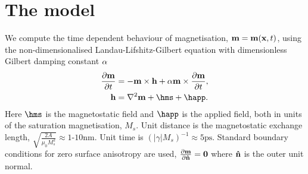 \documentclass[10pt, final, conference, transmag]{IEEEtran}
\begin{document}
\section{The model}

\iftransmagpaper
We compute the time dependent behaviour of magnetisation, $\mathbf{m} = \mathbf{m}(\mathbf{x}, t)$, using the non-dimensionalised
Landau-Lifshitz-Gilbert equation \cite{Aharoni1996} with dimensionless Gilbert damping constant $\alpha$
\begin{equation}
  \begin{aligned}
    \dmdt &= - \mv \times \hv + \dampc \mv \times \dmdt, \\
    \hv &= \lap \mv + \hms + \happ. \label{llg}
  \end{aligned}
\end{equation}
Here $\hms$ is the magnetostatic field and $\happ$ is the applied field, both in units of the saturation magnetisation, $M_s$.
Unit distance is the magnetostatic exchange length,
$\sqrt{\frac{2A}{\mu_0 M_s^2}} \approx 1\text{-}10\text{nm}$.
Unit time is $(|\gamma| M_s)^{-1} \approx 5\text{ps}$.
Standard boundary conditions for zero surface anisotropy are used, \ie $\frac{\partial \mathbf{m}}{\partial \mathbf{\hat{n}}} = \mathbf{0}$ where $\mathbf{\hat{n}}$ is the outer unit normal.
\end{document}
